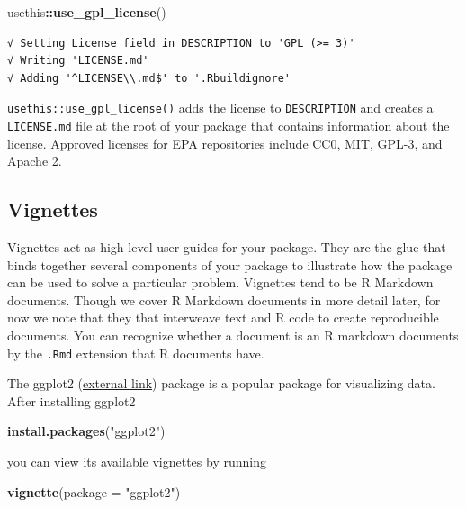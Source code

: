 \documentclass[
]{book}
\newenvironment{Shaded}{\begin{snugshade}}{\end{snugshade}}
\newcommand{\DataTypeTok}[1]{\textcolor[rgb]{0.13,0.29,0.53}{#1}}
\newcommand{\KeywordTok}[1]{\textcolor[rgb]{0.13,0.29,0.53}{\textbf{#1}}}
\newcommand{\NormalTok}[1]{#1}
\newcommand{\OperatorTok}[1]{\textcolor[rgb]{0.81,0.36,0.00}{\textbf{#1}}}
\newcommand{\StringTok}[1]{\textcolor[rgb]{0.31,0.60,0.02}{#1}}
\begin{document}
\begin{Shaded}
\begin{Highlighting}[]
\NormalTok{usethis}\OperatorTok{::}\KeywordTok{use_gpl_license}\NormalTok{()}
\end{Highlighting}
\end{Shaded}

\begin{verbatim}
√ Setting License field in DESCRIPTION to 'GPL (>= 3)'
√ Writing 'LICENSE.md'
√ Adding '^LICENSE\\.md$' to '.Rbuildignore'
\end{verbatim}

\texttt{usethis::use\_gpl\_license()} adds the license to \texttt{DESCRIPTION} and creates a \texttt{LICENSE.md} file at the root of your package that contains information about the license. Approved licenses for EPA repositories include CC0, MIT, GPL-3, and Apache 2.

\hypertarget{vignettes}{%
\subsection{Vignettes}\label{vignettes}}

Vignettes act as high-level user guides for your package. They are the glue that binds together several components of your package to illustrate how the package can be used to solve a particular problem. Vignettes tend to be R Markdown documents. Though we cover R Markdown documents in more detail later, for now we note that they that interweave text and R code to create reproducible documents. You can recognize whether a document is an R markdown documents by the \texttt{.Rmd} extension that R documents have.

The ggplot2 (\href{https://ggplot2.tidyverse.org/}{external link}) package is a popular package for visualizing data. After installing ggplot2

\begin{Shaded}
\begin{Highlighting}[]
\KeywordTok{install.packages}\NormalTok{(}\StringTok{"ggplot2"}\NormalTok{)}
\end{Highlighting}
\end{Shaded}

you can view its available vignettes by running

\begin{Shaded}
\begin{Highlighting}[]
\KeywordTok{vignette}\NormalTok{(}\DataTypeTok{package =} \StringTok{"ggplot2"}\NormalTok{)}
\end{Highlighting}
\end{Shaded}
\end{document}
